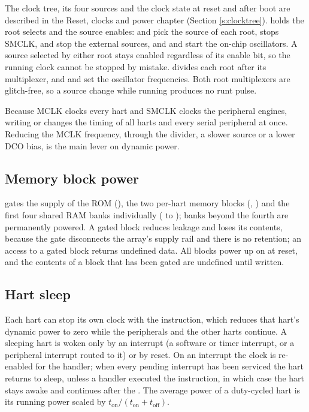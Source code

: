 The clock tree, its four sources and the clock state at reset and after boot are described in the Reset, clocks and power chapter (Section \ref{s:clocktree}).  holds the root selects and the source enables:  and  pick the source of each root,  stops SMCLK,  and  stop the external sources, and  and  start the on-chip oscillators. A source selected by either root stays enabled regardless of its enable bit, so the running clock cannot be stopped by mistake.  divides each root after its multiplexer, and  and  set the oscillator frequencies. Both root multiplexers are glitch-free, so a source change while running produces no runt pulse.

Because MCLK clocks every hart and SMCLK clocks the peripheral engines, writing  or  changes the timing of all \NumHartsWord{} harts and every serial peripheral at once. Reducing the MCLK frequency, through the divider, a slower source or a lower DCO bias, is the main lever on dynamic power.

\subsection{Memory block power} \label{ss:system-blockpwr}

\begin{sloppypar}
 gates the supply of the ROM (), the two per-hart memory blocks (, ) and the first four shared RAM banks individually ( to ); banks beyond the fourth are permanently powered. A gated block reduces leakage and loses its contents, because the gate disconnects the array's supply rail and there is no retention; an access to a gated block returns undefined data. All blocks power up on at reset, and the contents of a block that has been gated are undefined until written.
\end{sloppypar}

\subsection{Hart sleep} \label{ss:sleep}

Each hart can stop its own clock with the  instruction, which reduces that hart's dynamic power to zero while the peripherals and the other harts continue. A sleeping hart is woken only by an interrupt (a  software or timer interrupt, or a peripheral interrupt routed to it) or by reset. On an interrupt the clock is re-enabled for the handler; when every pending interrupt has been serviced the hart returns to sleep, unless a handler executed the  instruction, in which case the hart stays awake and continues after the . The average power of a duty-cycled hart is its running power scaled by $t_\textrm{on} / (t_\textrm{on} + t_\textrm{off})$.


